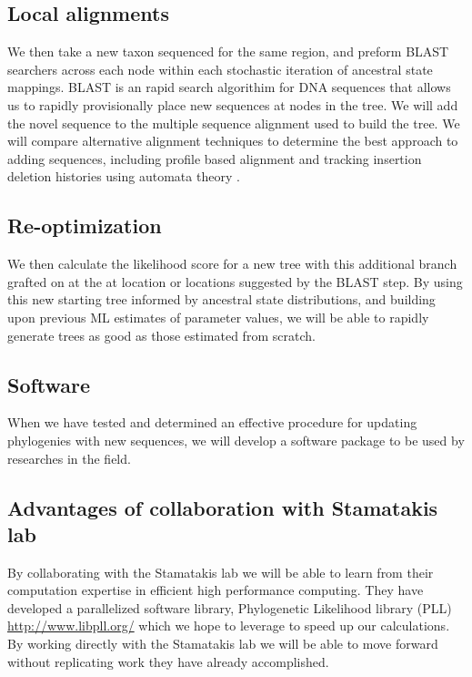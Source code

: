 \documentclass[10pt]{article}
\begin{document}
\subsection*{Local alignments}
We then take a new taxon sequenced for the same region, and preform BLAST searchers across each node within each stochastic iteration of ancestral state mappings. 
BLAST is an rapid search algorithim for DNA sequences that allows us to rapidly provisionally place new sequences at nodes in the tree. 
We will add the novel sequence to the multiple sequence alignment used to build the tree. 
We will compare alternative alignment techniques to determine the best approach to adding sequences, including profile based alignment \cite{loytynoja_accurate_2012} \cite{smith_mega-phylogeny_2009} and tracking insertion deletion histories using automata theory \cite{westesson_accurate_2012}.

\subsection*{Re-optimization}
We then calculate the likelihood score for a new tree with this additional branch grafted on at the at location or locations suggested by the BLAST step. 
By using this new starting tree informed by ancestral state distributions, and building upon previous ML estimates of parameter values, we will be able to rapidly generate trees as good as those estimated from scratch. 


\subsection*{Software}
When we have tested and determined an effective procedure for updating phylogenies with new sequences, we will develop a software package to be used by researches in the field.

\subsection*{Advantages of collaboration with Stamatakis lab}
By collaborating with the Stamatakis lab we will be able to learn from their computation expertise in efficient high performance computing. 
They have developed a parallelized software library, Phylogenetic Likelihood library (PLL) \url{http://www.libpll.org/} which we hope to leverage to speed up our calculations. 
By working directly with the Stamatakis lab we will be able to move forward without replicating work they have already accomplished.
\end{document}
